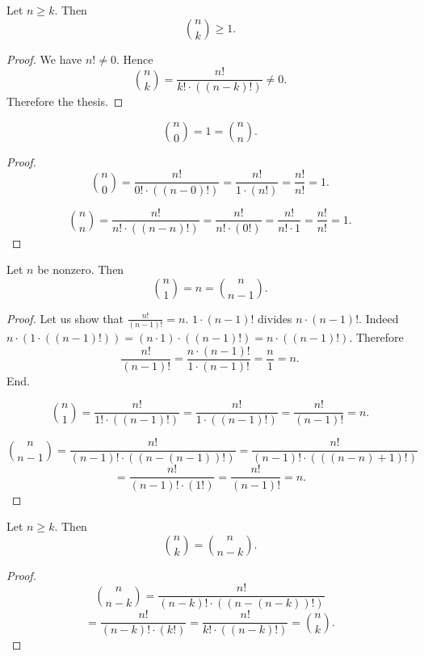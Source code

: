 \documentclass[../../arithmetic.ftl.tex]{subfiles}
\begin{document}
  \begin{forthel}
    \begin{proposition}\label{Arithmetic_03_06_502271}
      Let $n \geq k$.
      Then \[ \binom{n}{k} \geq 1. \]
    \end{proposition}
    \begin{proof}
      We have $n! \neq 0$.
      Hence \[ \binom{n}{k} = \frac{n!}{k! \cdot ((n - k)!)} \neq 0. \]
      Therefore the thesis.
    \end{proof}

    \begin{proposition}\label{Arithmetic_03_06_766613}
      \[ \binom{n}{0} = 1 = \binom{n}{n}. \]
    \end{proposition}
    \begin{proof}
      \[ \binom{n}{0}
          = \frac{n!}{0! \cdot ((n - 0)!)}
          = \frac{n!}{1 \cdot (n!)}
          = \frac{n!}{n!}
          = 1. \]

      \[ \binom{n}{n}
          = \frac{n!}{n! \cdot ((n - n)!)}
          = \frac{n!}{n! \cdot (0!)}
          = \frac{n!}{n! \cdot 1}
          = \frac{n!}{n!}
          = 1. \]
    \end{proof}

    \begin{proposition}\label{Arithmetic_03_06_877389}
      Let $n$ be nonzero.
      Then \[ \binom{n}{1} = n = \binom{n}{n - 1}. \]
    \end{proposition}
    \begin{proof}
      Let us show that $\frac{n!}{(n - 1)!} = n$.
        $1 \cdot (n - 1)!$ divides $n \cdot (n - 1)!$.
        Indeed $n \cdot (1 \cdot ((n - 1)!)) = (n \cdot 1) \cdot ((n - 1)!) = n \cdot ((n - 1)!)$.
        Therefore
        \[ \frac{n!}{(n - 1)!}
           = \frac{n \cdot (n - 1)!}{1 \cdot (n - 1)!}
           = \frac{n}{1}
           = n. \]
      End.

      \[ \binom{n}{1}
          = \frac{n!}{1! \cdot ((n - 1)!)}
          = \frac{n!}{1 \cdot ((n - 1)!)}
          = \frac{n!}{(n - 1)!}
          = n. \]

      \[ \binom{n}{n - 1}
          = \frac{n!}{(n - 1)! \cdot ((n - (n - 1))!)}
          = \frac{n!}{(n - 1)! \cdot (((n - n) + 1)!)} \]
      \[  = \frac{n!}{(n - 1)! \cdot (1!)}
          = \frac{n!}{(n - 1)!}
          = n. \]
    \end{proof}

    \begin{proposition}\label{Arithmetic_03_06_360382}
      Let $n \geq k$.
      Then \[ \binom{n}{k} = \binom{n}{n - k}. \]
    \end{proposition}
    \begin{proof}
      \[ \binom{n}{n - k}
          = \frac{n!}{(n - k)! \cdot ((n - (n - k))!)} \]
      \[  = \frac{n!}{(n - k)! \cdot (k!)}
          = \frac{n!}{k! \cdot ((n - k)!)}
          = \binom{n}{k}. \]
    \end{proof}
  \end{forthel}
\end{document}
